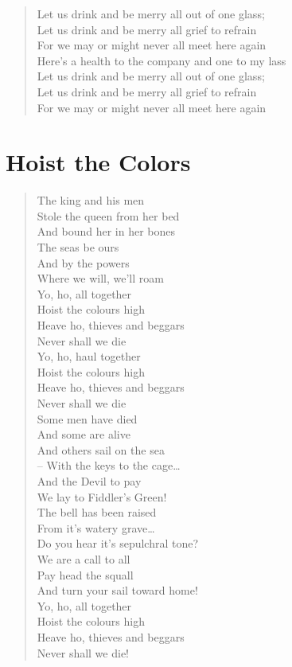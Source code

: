 \documentclass[11pt]{article}
\begin{document}
\begin{verse}
Let us drink and be merry all out of one glass;\\
Let us drink and be merry all grief to refrain\\
For we may or might never all meet here again\\
\vspace*{1em}
Here's a health to the company and one to my lass\\
Let us drink and be merry all out of one glass;\\
Let us drink and be merry all grief to refrain\\
For we may or might never all meet here again\\
\end{verse}
\clearpage
\section{Hoist the Colors}
\label{sec:org94ac46d}
\begin{verse}
The king and his men\\
Stole the queen from her bed\\
And bound her in her bones\\
The seas be ours\\
And by the powers\\
Where we will, we'll roam\\
\vspace*{1em}
Yo, ho, all together\\
Hoist the colours high\\
Heave ho, thieves and beggars\\
Never shall we die\\
Yo, ho, haul together\\
Hoist the colours high\\
Heave ho, thieves and beggars\\
Never shall we die\\
\vspace*{1em}
Some men have died\\
And some are alive\\
And others sail on the sea\\
– With the keys to the cage\ldots{}\\
And the Devil to pay\\
We lay to Fiddler's Green!\\
\vspace*{1em}
The bell has been raised\\
From it's watery grave\ldots{}\\
Do you hear it's sepulchral tone?\\
We are a call to all\\
Pay head the squall\\
And turn your sail toward home!\\
\vspace*{1em}
Yo, ho, all together\\
Hoist the colours high\\
Heave ho, thieves and beggars\\
Never shall we die!\\
\end{verse}
\clearpage
\end{document}
